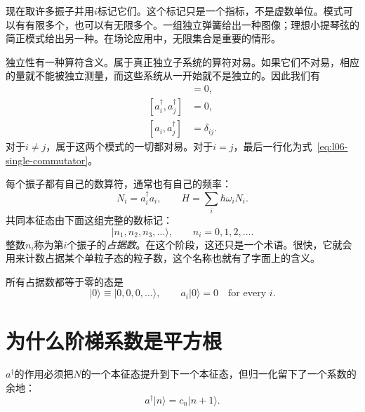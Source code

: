 现在取许多振子并用\(i\)标记它们。这个标记只是一个指标，不是虚数单位。模式可以有有限多个，也可以有无限多个。一组独立弹簧给出一种图像；理想小提琴弦的简正模式给出另一种。在场论应用中，无限集合是重要的情形。

独立性有一种算符含义。属于真正独立子系统的算符对易。如果它们不对易，相应的量就不能被独立测量，而这些系统从一开始就不是独立的。因此我们有
\begin{align}
[a_i,a_j]&=0, \\
[a_i^\dagger,a_j^\dagger]&=0, \\
[a_i,a_j^\dagger]&=\delta_{ij}.
\label{eq:l06-many-commutators}
\end{align}
对于\(i\ne j\)，属于这两个模式的一切都对易。对于\(i=j\)，最后一行化为式~\eqref{eq:l06-single-commutator}。

每个振子都有自己的数算符，通常也有自己的频率：
\begin{equation}
N_i=a_i^\dagger a_i,
\qquad
H=\sum_i\hbar\omega_i N_i.
\label{eq:l06-many-hamiltonian}
\end{equation}
共同本征态由下面这组完整的数标记：
\begin{equation}
|n_1,n_2,n_3,\ldots\rangle,
\qquad n_i=0,1,2,\ldots.
\label{eq:l06-occupation-ket}
\end{equation}
整数\(n_i\)称为第\(i\)个振子的\emph{占据数}。在这个阶段，这还只是一个术语。很快，它就会用来计数占据某个单粒子态的粒子数，这个名称也就有了字面上的含义。

所有占据数都等于零的态是
\begin{equation}
|0\rangle\equiv|0,0,0,\ldots\rangle,
\qquad a_i|0\rangle=0\quad\text{for every }i.
\label{eq:l06-oscillator-vacuum}
\end{equation}

\begin{classroomqa}
\end{classroomqa}

\section{为什么阶梯系数是平方根}

\(a^\dagger\)的作用必须把\(N\)的一个本征态提升到下一个本征态，但归一化留下了一个系数的余地：
\begin{equation}
a^\dagger|n\rangle=c_n|n+1\rangle.
\label{eq:l06-unknown-coefficient}
\end{equation}

